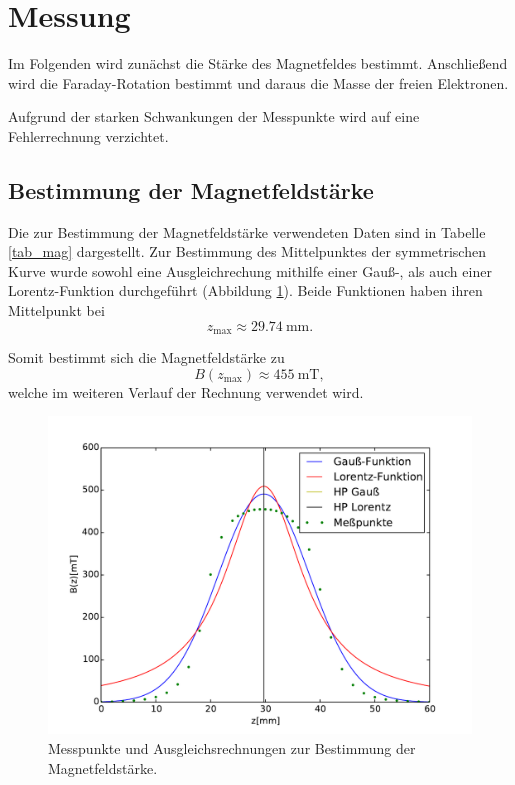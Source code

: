 
\section{Messung} %
\label{sec:messung}
\FloatBarrier
Im Folgenden wird zunächst die Stärke des Magnetfeldes bestimmt. 
Anschließend wird die Faraday-Rotation bestimmt und daraus die Masse der freien Elektronen.

Aufgrund der starken Schwankungen der Messpunkte wird auf eine Fehlerrechnung verzichtet.

\subsection{Bestimmung der Magnetfeldstärke} %
\label{sub:bestimmung_der_magnetfeldstärke}

Die zur Bestimmung der Magnetfeldstärke verwendeten Daten sind in Tabelle \ref{tab_mag} dargestellt.
Zur Bestimmung des Mittelpunktes der symmetrischen Kurve wurde sowohl eine Ausgleichrechung mithilfe einer Gauß-, als auch einer Lorentz-Funktion durchgeführt (Abbildung \ref{fig_mag}).
Beide Funktionen haben ihren Mittelpunkt bei
\begin{equation*}
	z_\text{max} \approx \SI{29.74}{\milli\meter}.
\end{equation*}

Somit bestimmt sich die Magnetfeldstärke zu
\begin{equation*}
	B(z_\text{max}) \approx \SI{455}{\milli\tesla},
\end{equation*}
welche im weiteren Verlauf der Rechnung verwendet wird.

\begin{figure}
	\centering
	\includegraphics[width = 14cm]{data/gauss.pdf}
	\caption{Messpunkte und Ausgleichsrechnungen zur Bestimmung der Magnetfeldstärke.}
	\label{fig_mag}
\end{figure}


